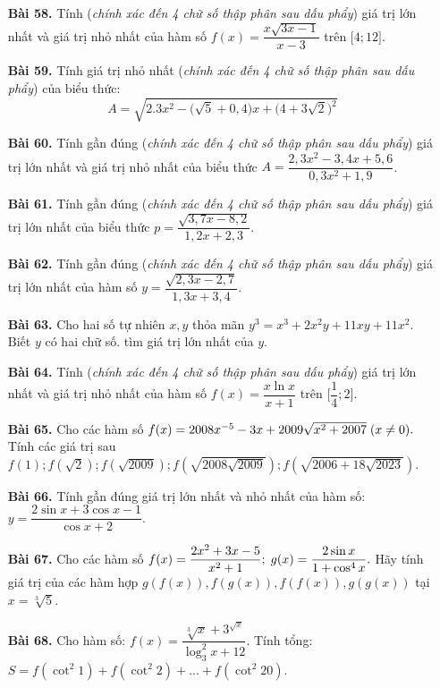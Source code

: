 \documentclass[12pt,a4paper]{article}
\begin{document}
\begin{enumerate}
\item[\textbf{Bài 58.}] Tính (\textit{chính xác đến 4 chữ số thập phân sau dấu phẩy}) giá trị lớn nhất và giá trị nhỏ nhất của hàm số $f(x) = \dfrac{x\sqrt{3x-1}}{x-3}$ trên $\lbrack 4;12 \rbrack$.
\item[\textbf{Bài 59.}] Tính giá trị nhỏ nhất (\textit{chính xác đến 4 chữ số thập phân sau dấu phẩy}) của biểu thức:
\begin{equation*}
    A = \sqrt{2.3x^2 - \big(\sqrt{5} + 0,4\big)x + \big(4 + 3\sqrt{2}\big)^2}
\end{equation*}
\item[\textbf{Bài 60.}] Tính gần đúng (\textit{chính xác đến 4 chữ số thập phân sau dấu phẩy}) giá trị lớn nhất và giá trị nhỏ nhất của biểu thức $A = \dfrac{2,3x^2 - 3,4x + 5,6}{0,3x^2 + 1,9}$.
\item[\textbf{Bài 61.}] Tính gần đúng (\textit{chính xác đến 4 chữ số thập phân sau dấu phẩy}) giá trị lớn nhất của biểu thức $p = \dfrac{\sqrt{3,7x - 8,2}}{1,2x + 2,3}.$ 
\item[\textbf{Bài 62.}] Tính gần đúng (\textit{chính xác đến 4 chữ số thập phân sau dấu phẩy}) giá trị lớn nhất của hàm số $y = \dfrac{\sqrt{2,3x - 2,7}}{1,3x + 3,4}.$ 
\item[\textbf{Bài 63.}] Cho hai số tự nhiên $x,y$ thỏa mãn $y^3 = x^3 + 2x^2y + 11xy + 11x^2$. Biết $y$ có hai chữ số. tìm giá trị lớn nhất của $y$. 
\item[\textbf{Bài 64.}] Tính (\textit{chính xác đến 4 chữ số thập phân sau dấu phẩy}) giá trị lớn nhất và giá trị nhỏ nhất của hàm số $f(x) = \dfrac{x\ln x}{x+1}$ trên $\bigg\lbrack \dfrac{1}{4};2 \bigg\rbrack$.
\item[\textbf{Bài 65.}] Cho các hàm số $f(x) = 2008x^{-5} - 3x + 2009\sqrt{x^2 + 2007} \thickspace (x \neq 0).$ Tính các giá trị sau $f(1); f(\sqrt{2}); f(\sqrt{2009}); f(\sqrt{2008\sqrt{2009}}); f(\sqrt{2006 + 18\sqrt{2023}})$.
\item[\textbf{Bài 66.}] Tính gần đúng giá trị lớn nhất và nhỏ nhất của hàm số: $y = \dfrac{2\sin x + 3\cos x - 1}{\cos x + 2}.$
\item[\textbf{Bài 67.}] Cho các hàm số $f(x) = \dfrac{2x^2 + 3x - 5}{x^2 + 1};\thickspace g(x) = \dfrac{2\sin x}{1+\cos^4 x}.$ Hãy tính giá trị của các hàm hợp $g(f(x)), f(g(x)), f(f(x)), g(g(x))$ tại $x = \sqrt[3]{5}$.
\item[\textbf{Bài 68.}] Cho hàm số: $f(x) = \dfrac{\sqrt[3]{x} + 3^{\sqrt{x}}}{\log^2_3 x + 12}$. Tính tổng: $S = f(\cot^2 1) + f(\cot^2 2) + ... + f(\cot^2 20).$

\end{enumerate}
\end{document}
